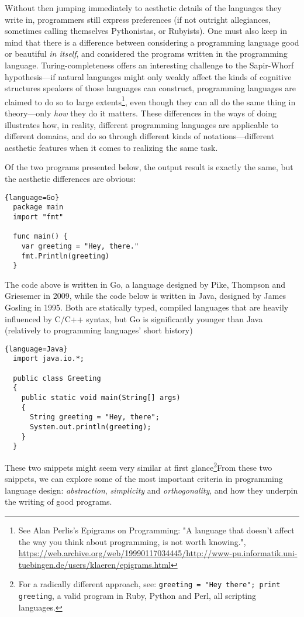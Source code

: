 Without  then jumping immediately to aesthetic details of the languages they write in, programmers still express preferences (if not outright allegiances, sometimes calling themselves Pythonistas, or Rubyists). One must also keep in mind that there is a difference between considering a programming language good or beautiful \emph{in itself}, and considered the programs written in the programming language. Turing-completeness offers an interesting challenge to the Sapir-Whorf hypothesis—if natural languages might only weakly affect the kinds of cognitive structures speakers of those languages can construct, programming languages are claimed to do so to large extents\footnote{See Alan Perlis's Epigrams on Programming: "A language that doesn't affect the way you think about programming, is not worth knowing.", \url{https://web.archive.org/web/19990117034445/http://www-pu.informatik.uni-tuebingen.de/users/klaeren/epigrams.html}}, even though they can all do the same thing in theory—only \emph{how} they do it matters. These differences in the ways of doing illustrates how, in reality, different programming languages are applicable to different domains, and do so through different kinds of notations—different aesthetic features when it comes to realizing the same task.

Of the two programs presented below, the output result is exactly the same, but the aesthetic differences are obvious:

\begin{lstlisting}{language=Go}
  package main
  import "fmt"

  func main() {
    var greeting = "Hey, there."
    fmt.Println(greeting)
  }
\end{lstlisting}

The code above is written in Go, a language designed by Pike, Thompson and Griesemer in 2009, while the code below is written in Java, designed by James Gosling in 1995. Both are statically typed, compiled languages that are heavily influenced by C/C++ syntax, but Go is significantly younger than Java (relatively to programming languages' short history)

\begin{lstlisting}{language=Java}
  import java.io.*;

  public class Greeting
  {
    public static void main(String[] args)
    {
      String greeting = "Hey, there";
      System.out.println(greeting);
    }
  }
\end{lstlisting}

These two snippets might seem very similar at first glance\footnote{For a radically different approach, see: \lstinline{greeting = "Hey there"; print greeting}, a valid program in Ruby, Python and Perl, all scripting languages.}From these two snippets, we can explore some of the most important criteria in programming language design: \emph{abstraction}, \emph{simplicity} and \emph{orthogonality}\citep{sebesta_concepts_2018}, and how they underpin the writing of good programs.

